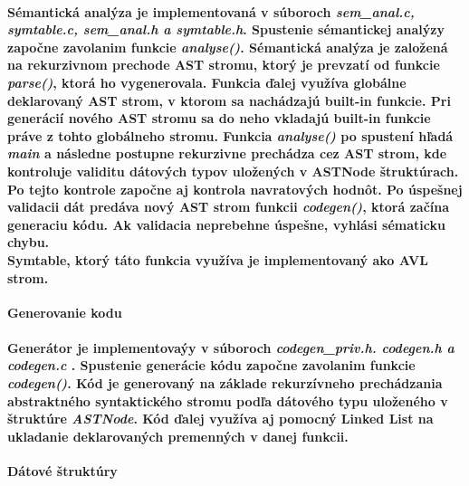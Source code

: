 \documentclass[12pt]{article}
\begin{document}
\paragraph{Sémantická analýza je implementovaná v súboroch \textit{sem\_anal.c, symtable.c, sem\_anal.h a symtable.h}. Spustenie sémantickej analýzy započne zavolanim funkcie \textit{analyse()}. Sémantická analýza je založená na rekurzivnom prechode AST stromu, ktorý je prevzatí od funkcie \textit{parse()}, ktorá ho vygenerovala. Funkcia ďalej využíva globálne deklarovaný AST strom, v ktorom sa nachádzajú built-in funkcie. Pri generácií nového AST stromu sa do neho vkladajú built-in funkcie práve z tohto globálneho stromu. Funkcia \textit{analyse()} po spustení hľadá \textit{main} a následne postupne rekurzivne prechádza cez AST strom, kde kontroluje validitu dátových typov uložených v ASTNode štruktúrach. Po tejto kontrole započne aj kontrola navratových hodnôt. Po úspešnej validacii dát predáva nový AST strom funkcii \textit{codegen()}, ktorá začína generaciu kódu. Ak validacia neprebehne úspešne, vyhlási sématicku chybu. \newline \\
Symtable, ktorý táto funkcia využíva je implementovaný ako AVL strom.  \newline \\}

 \Large \textbf{Generovanie kodu} \normalsize \\
\noindent\makebox[\linewidth]{\rule{\textwidth}{0.4pt}}

\paragraph{Generátor je implementovaýy v súboroch \textit{codegen\_priv.h. codegen.h a codegen.c }. Spustenie generácie kódu započne zavolanim funkcie \textit{codegen()}. Kód je generovaný na základe rekurzívneho prechádzania abstraktného syntaktického stromu podľa dátového typu uloženého v štruktúre \textit{ASTNode}. Kód ďalej využíva aj pomocný Linked List na ukladanie deklarovaných premenných v danej funkcii. \newline \\}


\newpage

 \Large \textbf{Dátové štruktúry}\normalsize \\
\noindent\makebox[\linewidth]{\rule{\textwidth}{0.4pt}}
\end{document}
